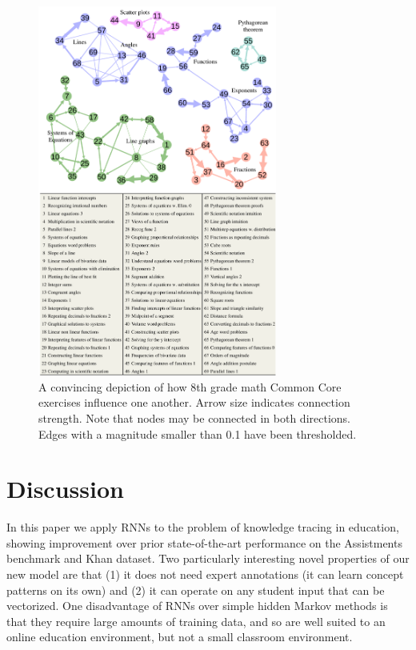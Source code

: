 \begin{figure}[!h]
\centering
\includegraphics[width=0.7\textwidth]{img/conceptClusters_khan}
\caption[Conditional influences Khan]{A convincing depiction of how 8th grade math Common Core exercises influence one another.
Arrow size indicates connection strength. Note that nodes may be connected in both directions. Edges with a magnitude smaller than 0.1 have been thresholded. 
\label{fig:conceptClusters}
}

\end{figure}


\section{Discussion}

In this paper we apply RNNs to the problem of knowledge tracing in education, showing improvement over prior state-of-the-art performance on the Assistments benchmark and Khan dataset.
Two particularly interesting novel properties of our new model are that (1) it does not need expert annotations (it can learn concept patterns on its own) and (2) it can operate on any student input that can be vectorized. One disadvantage of RNNs over simple hidden Markov methods is that they require large amounts of training data, and so are well suited to an online education environment, but not a small classroom environment. 


